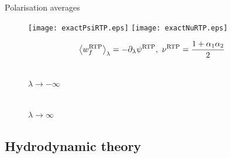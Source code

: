 \documentclass{beamer}
\begin{document}
\begin{frame}{Polarisation averages}


\vspace{-15pt}
\begin{figure}
\centering
\texttt{[image: exactPsiRTP.eps]}
\texttt{[image: exactNuRTP.eps]}
\end{figure}

\vspace{-10pt}
\begin{equation}
\left<w_f^{\rm RTP}\right>_{\lambda} = -\partial_{\lambda} \psi^{\rm RTP},~ \nu^{\rm RTP} = \frac{1 + \alpha_1\alpha_2}{2}
\end{equation}

\begin{figure}
\centering
\begin{minipage}{0.49\textwidth}
\centering
\\
$\lambda \to -\infty$
\end{minipage}
\begin{minipage}{0.49\textwidth}
\centering
\\
$\lambda \to \infty$
\end{minipage}
\end{figure}


\end{frame}

\subsection{Hydrodynamic theory}
\end{document}
